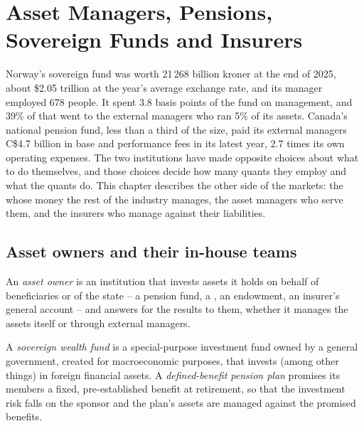 \chapter{Asset Managers, Pensions, Sovereign Funds and Insurers}\label{ch:in:asset-managers-pensions-sovereign-funds-and-insurers}

Norway's sovereign fund was worth 21\,268 billion kroner at the end of 2025, about \$2.05 trillion at the year's average
exchange rate, and its manager employed 678 people. It spent 3.8 basis points of the fund on management, and 39\% of that
went to the external managers who ran 5\% of its assets. Canada's national pension fund, less than a third of the size,
paid its external managers C\$4.7 billion in base and performance fees in its latest year, 2.7 times its own
operating expenses. The two institutions have made opposite choices about what to do themselves, and those choices decide how
many quants they employ and what the quants do. This chapter describes the other side of the markets: the 
whose money the rest of the industry manages, the asset managers who serve them, and the insurers who manage against
their liabilities.

\section{Asset owners and their in-house teams}

\begin{definition}\label{def:in:asset-managers-pensions-sovereign-funds-and-insurers:owner}
An \emph{asset owner} is an institution that invests assets it holds on behalf of beneficiaries or of
the state -- a pension fund, a , an endowment, an insurer's general account -- and answers for the
results to them, whether it manages the assets itself or through external managers.
\end{definition}

\begin{definition}\label{def:in:asset-managers-pensions-sovereign-funds-and-insurers:swf}
A \emph{sovereign wealth fund} is a special-purpose investment fund owned by a general
government, created for macroeconomic purposes, that invests (among other things) in foreign financial assets. A
\emph{defined-benefit pension plan} promises its members a fixed, pre-established
benefit at retirement, so that the investment risk falls on the sponsor and the plan's assets are managed against the
promised benefits.
\end{definition}

